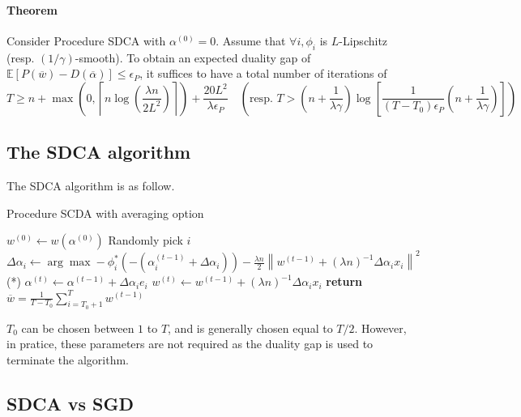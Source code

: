 \documentclass{article}
\newcommand{\norm}[1]{\left\|#1 \right\|}
\begin{document}
\paragraph{Theorem} Consider Procedure SDCA with $\alpha^{(0)} = 0$.
Assume that $\forall i, \phi_i$ is $L$-Lipschitz (resp.
$(1/\gamma)$-smooth).
To obtain an expected duality gap of $\mathbb{E}[P(\overline{w})-D(\overline{\alpha})] \leq \epsilon_P$, it suffices to have a total number of iterations of
\begin{equation}
	T \geq n + \max\left(0, \left\lceil n \log \left(\dfrac{\lambda n}{2 L^2} \right) \right\rceil \right) + \dfrac{20 L^2}{\lambda \epsilon_P} \quad \left( \text{resp. } T > \left(n + \dfrac{1}{\lambda \gamma} \right) \log \left[ \dfrac{1}{(T-T_0)\epsilon_P} \left(n + \dfrac{1}{\lambda \gamma} \right) \right] \right)
\end{equation}



\subsection{The SDCA algorithm}

The SDCA algorithm is as follow.

\begin{algorithm}
	\caption{Procedure SCDA with averaging option}
	\begin{algorithmic}
		\State $w^{(0)} \gets w(\alpha^{(0)})$
		\State Randomly pick $i$
		\State $\Delta \alpha_i \gets \arg \max -\phi^{*}_i(-(\alpha_i^{(t-1)}+\Delta \alpha_i))-\frac{\lambda n}{2}\norm{w^{(t-1)}+(\lambda n)^{-1}\Delta \alpha_i x_i}^2$ \qquad \qquad \qquad \qquad \qquad (*)
		\State $\alpha^{(t)} \gets \alpha^{(t-1)} + \Delta \alpha_i e_i$
		\State $w^{(t)} \gets w^{(t-1)} + (\lambda n)^{-1} \Delta \alpha_i x_i$
		\EndFor
		\State \textbf{return} $\overline{w} = \frac{1}{T-T_0} \sum_{i = T_0+1}^T w^{(t-1)}$
		\EndProcedure
	\end{algorithmic}
\end{algorithm}

$T_0$ can be chosen between $1$ to $T$, and is generally chosen equal to $T/2$.
However, in pratice, these parameters are not required as the duality gap is used to terminate the algorithm.


\subsection{SDCA vs SGD}
\end{document}

